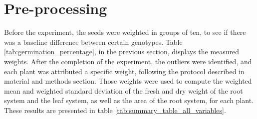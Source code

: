 \section{Pre-processing}
Before the experiment, the seeds were weighted in groups of ten, to see if there was a baseline difference between certain genotypes. Table \ref{tab:germination_percentage}, in the previous section, displays the measured weights.
After the completion of the experiment, the outliers were identified, and each plant was attributed a specific weight, following the protocol described in material and methods section. Those weights were used to compute the weighted mean and weighted standard deviation of the fresh and dry weight of the root system and the leaf system, as well as the area of the root system, for each plant. These results are presented in table \ref{tab:summary_table_all_variables}.

